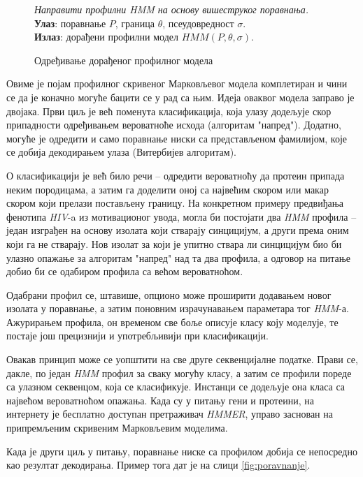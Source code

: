 \documentclass[12pt,oneside]{memoir}
\newenvironment{problem}[1][!ht]
{\renewcommand{\algorithmcfname}{Проблем}
\begin{figure}[!ht]
\centering
  \begin{minipage}{.94\linewidth}
	\begin{algorithm}[#1]%
  }{\end{algorithm}
  \end{minipage}
\end{figure}}
\begin{document}
\begin{CJK}{UTF8}{ipxm}
\begin{problem}[H]
  \SetAlgoLined
  \textit{Направити профилни \textit{HMM} на основу вишеструког поравнања.}\\
  \textbf{Улаз}: поравнање $P$, граница $\theta$, псеудовредност $\sigma$.\\
  \textbf{Излаз}: дорађени профилни модел $HMM(P, \theta, \sigma)$.
  \caption{Одређивање дорађеног профилног модела\cite{ba10f}}
  \label{prob:prof_sigma}
\end{problem}

Овиме је појам профилног скривеног Марковљевог модела комплетиран и чини се да је коначно могуће бацити се у рад са њим. Идеја оваквог модела заправо је двојака. Први циљ је већ поменута класификација, која улазу додељује скор припадности одређивањем вероватноће исхода (алгоритам "напред"). Додатно, могуће је одредити и само поравнање ниски са представљеном фамилијом, које се добија декодирањем улаза (Витербијев алгоритам).

О класификацији је већ било речи -- одредити вероватноћу да протеин припада неким породицама, а затим га доделити оној са највећим скором или макар скором који прелази постављену границу. На конкретном примеру предвиђања фенотипа \textit{HIV}-a из мотивационог увода, могла би постојати два \textit{HMM} профила -- један изграђен на основу изолата који стварају синцицијум, а други према оним који га не стварају. Нов изолат за који је упитно ствара ли синцицијум био би улазно опажање за алгоритам "напред" над та два профила, а одговор на питање добио би се одабиром профила са већом вероватноћом.

Одабрани профил се, штавише, опционо може проширити додавањем новог изолата у поравнање, а затим поновним израчунавањем параметара тог \textit{HMM}-а. Ажурирањем профила, он временом све боље описује класу коју моделује, те постаје још прецизнији и употребљивији при класификацији.

Овакав принцип може се уопштити на све друге секвенцијалне податке. Прави се, дакле, по један \textit{HMM} профил за сваку могућу класу, а затим се профили пореде са улазном секвенцом, која се класификује. Инстанци се додељује она класа са највећом вероватноћом опажања. Када су у питању гени и протеини, на интернету је бесплатно доступан претраживач \textit{HMMER}\cite{hmmer}, управо заснован на припремљеним скривеним Марковљевим моделима.

Када је други циљ у питању, поравнање ниске са профилом добија се непосредно као резултат декодирања. Пример тога дат је на слици \ref{fig:poravnanje}.


\end{CJK}
\end{document}
